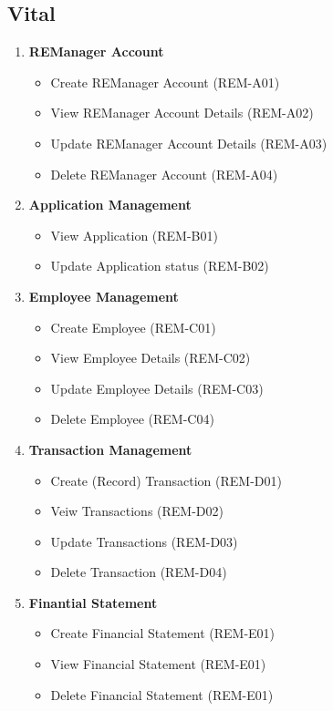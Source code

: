 \documentclass[11pt]{article}
\begin{document}
		\subsection{Vital}
		\begin{enumerate}[i]
			\item \textbf{REManager Account}
			\begin{itemize}
				\item Create REManager Account (REM-A01)
				\item View REManager Account Details (REM-A02)
				\item Update REManager Account Details (REM-A03)
				\item Delete REManager Account (REM-A04)
			\end{itemize}
			
			\item \textbf{Application Management}
			\begin{itemize}
				\item View Application (REM-B01)
				\item Update Application status (REM-B02)
			\end{itemize}
			
			\item \textbf{Employee Management}
			\begin{itemize}
				\item Create Employee (REM-C01)
				\item View Employee Details (REM-C02)
				\item Update Employee Details (REM-C03)
				\item Delete Employee (REM-C04)
			\end{itemize}
			
			\item \textbf{Transaction Management}
			\begin{itemize}
				\item Create (Record) Transaction  (REM-D01)
				\item Veiw Transactions  (REM-D02)
				\item Update Transactions  (REM-D03)
				\item Delete Transaction  (REM-D04)
			\end{itemize}
			
			\item \textbf{Finantial Statement}
			\begin{itemize}
				\item Create Financial Statement (REM-E01)
				\item View Financial Statement (REM-E01)
				\item Delete Financial Statement (REM-E01)
			\end{itemize}
		\end{enumerate}
		
\end{document}
